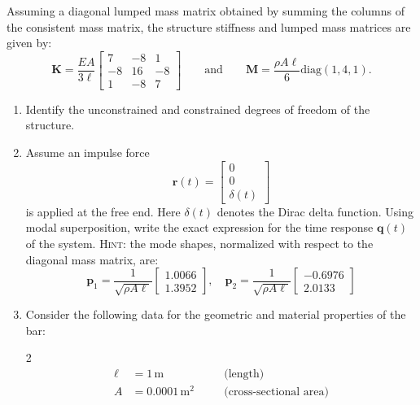 \documentclass[12pt]{article}
\begin{document}
Assuming a diagonal lumped mass matrix obtained by summing the columns of the consistent mass matrix, the structure stiffness and lumped mass matrices are given by:
\[
  \mathbf{K} = \frac{EA}{3\ell}
  \begin{bmatrix}
    7  & -8 & 1  \\
    -8 & 16 & -8 \\
    1  & -8 & 7
  \end{bmatrix}\qquad\text{and}\qquad
  \mathbf{M} = \frac{\rho A \ell}{6} \text{diag}(1, 4, 1).
\]
\begin{enumerate}
  \item Identify the unconstrained and constrained degrees of freedom of the structure.
  \item Assume an impulse force
        $$\mathbf r(t) = \begin{bmatrix}
            0 \\ 0\\ \delta(t)
          \end{bmatrix}$$
        is applied at the free end. Here $\delta(t)$ denotes the Dirac delta function. Using modal superposition, write the exact expression for the time response \(\mathbf q(t) \) of the system. \newline \textsc{Hint:} the mode shapes, normalized with respect to the diagonal mass matrix, are:
        \[
          \mathbf{p}_{1} = \frac{1}{\sqrt{\rho A \ell}}
          \begin{bmatrix}
            1.0066 \\
            1.3952
          \end{bmatrix}, \quad
          \mathbf{p}_{2} =\frac{1}{\sqrt{\rho A \ell}}
          \begin{bmatrix}
            -0.6976 \\
            2.0133
          \end{bmatrix}
        \]
  \item Consider the following data for the geometric and material properties of the bar:
        \vspace{-1cm}
        \begin{multicols}{2}
          \[
            \begin{aligned}
              \ell & = 1 \, \text{m} \quad        &  & \text{(length)}               \\
              A    & = 0.0001 \, \text{m}^2 \quad &  & \text{(cross-sectional area)} \\
            \end{aligned}
          \]


\end{multicols}
\end{enumerate}
\end{document}
